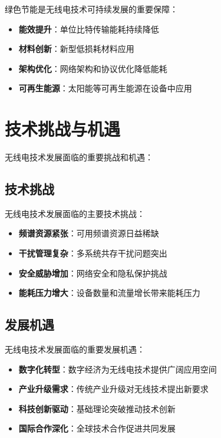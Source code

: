 \documentclass[12pt,UTF8]{ctexbook}
\begin{document}
绿色节能是无线电技术可持续发展的重要保障：

\begin{itemize}[leftmargin=3.5em]
    \item \textbf{能效提升}：单位比特传输能耗持续降低
    \item \textbf{材料创新}：新型低损耗材料应用
    \item \textbf{架构优化}：网络架构和协议优化降低能耗
    \item \textbf{可再生能源}：太阳能等可再生能源在设备中应用
\end{itemize}

\chapter{技术挑战与机遇}

无线电技术发展面临的重要挑战和机遇：

\section{技术挑战}

无线电技术发展面临的主要技术挑战：

\begin{itemize}[leftmargin=3.5em]
    \item \textbf{频谱资源紧张}：可用频谱资源日益稀缺
    \item \textbf{干扰管理复杂}：多系统共存干扰问题突出
    \item \textbf{安全威胁增加}：网络安全和隐私保护挑战
    \item \textbf{能耗压力增大}：设备数量和流量增长带来能耗压力
\end{itemize}

\section{发展机遇}

无线电技术发展面临的重要发展机遇：

\begin{itemize}[leftmargin=3.5em]
    \item \textbf{数字化转型}：数字经济为无线电技术提供广阔应用空间
    \item \textbf{产业升级需求}：传统产业升级对无线技术提出新要求
    \item \textbf{科技创新驱动}：基础理论突破推动技术创新
    \item \textbf{国际合作深化}：全球技术合作促进共同发展
\end{itemize}

\backmatter
\end{document}
